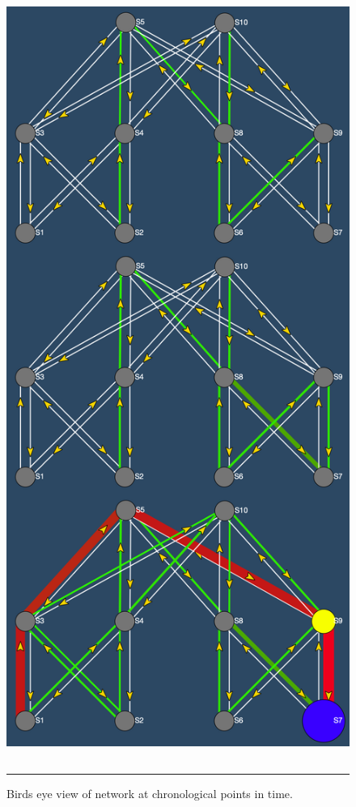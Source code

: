 \begin{figure}[htbp]
	\centering
		\includegraphics[width=20cm,height=25cm,keepaspectratio]{Figures/genview_under.png}
		\rule{35em}{0.5pt}
	\caption[Birds eye view, Link Underprovisioning]{Birds eye view of network at chronological points in time.}
	\label{fig:genview_under}
\end{figure}

